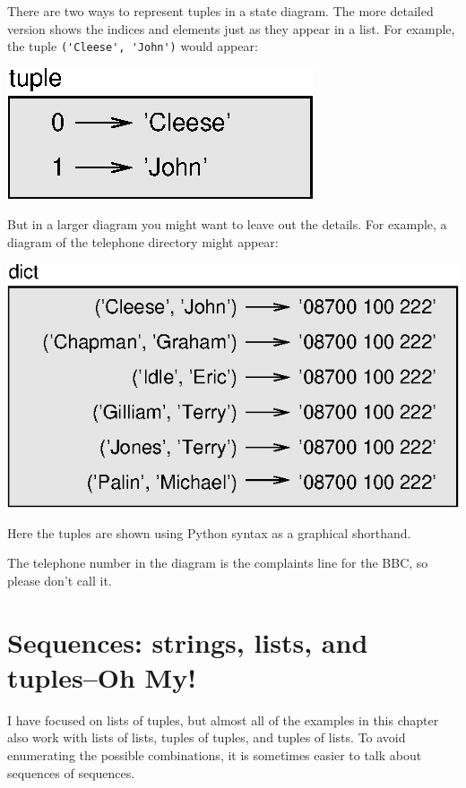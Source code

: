 \documentclass[10pt]{book}
\begin{document}
There are two ways to represent tuples in a state diagram.  The more
detailed version shows the indices and elements just as they appear in
a list.  For example, the tuple \verb"('Cleese', 'John')" would appear:


\beforefig
\centerline{\includegraphics{figs/tuple1.eps}}
\afterfig

But in a larger diagram you might want to leave out the
details.  For example, a diagram of the telephone directory might
appear:

\beforefig
\centerline{\includegraphics{figs/dict2.eps}}
\afterfig

Here the tuples are shown using Python syntax as a graphical
shorthand.

The telephone number in the diagram is the complaints line for the
BBC, so please don't call it.

\section{Sequences: strings, lists, and tuples--Oh My!}

I have focused on lists of tuples, but almost all of the examples in
this chapter also work with lists of lists, tuples of tuples, and
tuples of lists.  To avoid enumerating the possible combinations, it
is sometimes easier to talk about sequences of sequences.
\end{document}
